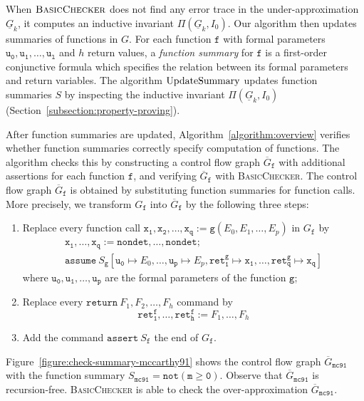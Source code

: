 When $\textsc{BasicChecker}$ does not find any error trace in the
under-approximation $\underline{G}_k$, it computes an inductive
invariant $\Pi (\underline{G}_k, I_0)$. Our algorithm then updates
summaries of functions in $G$. For each function $\mathtt{f}$ with
formal parameters $\mathtt{u_0}, \mathtt{u_1}, \ldots, \mathtt{u_l}$
and $h$ return values, a \emph{function summary} for $\mathtt{f}$ is a
first-order conjunctive formula which specifies the relation between
its formal parameters and return variables. The algorithm
$\textmd{UpdateSummary}$ updates function summaries $S$ by inspecting
the inductive invariant $\Pi (\underline{G}_k, I_0)$
(Section~\ref{subsection:property-proving}). 

After function summaries are updated, Algorithm~\ref{algorithm:overview} 
verifies whether function summaries correctly specify computation of
functions. The algorithm checks this by constructing a control flow
graph $\overline{G}_{\mathtt{f}}$ with additional assertions for each
function $\mathtt{f}$, and verifying $\overline{G}_{\mathtt{f}}$ with
\textsc{BasicChecker}. The control flow graph
$\overline{G}_{\mathtt{f}}$ is obtained by substituting function
summaries for function calls. More precisely, we transform
$G_{\mathtt{f}}$ into $\overline{G}_{\mathtt{f}}$ by the following
three steps:
\begin{enumerate}
\item Replace every function call $\mathtt{x_1}, \mathtt{x_2}, \ldots,
  \mathtt{x_q} := \mathtt{g} (E_0, E_1, \ldots, E_p)$ in $G_{\mathtt{f}}$ by 
  \begin{equation*}
    \begin{array}{l}
      \mathtt{x_1}, \ldots, \mathtt{x_q} :=
      \mathtt{nondet}, \ldots, \mathtt{nondet};\\
      \mathtt{assume}\ 
      S_{\mathtt{g}}[\mathtt{u_0} \mapsto E_0, \ldots, 
      \mathtt{u_p} \mapsto E_p, \mathtt{ret^g_1} \mapsto \mathtt{x_1},
      \ldots, \mathtt{ret^g_q} \mapsto \mathtt{x_q}]
    \end{array}
  \end{equation*}
  where $\mathtt{u_0}, \mathtt{u_1}, \ldots, \mathtt{u_p}$
  are the formal parameters of the function $\mathtt{g}$;
\item Replace every $\mathtt{return\ }F_1, F_2, \ldots, F_h$ command by
  \begin{equation*}
    \mathtt{ret^f_1}, \ldots, \mathtt{ret^f_h} := F_1, \ldots, F_h
  \end{equation*}
\item Add the command $\mathtt{assert\ }S_{\mathtt{f}}$ the end of
  $G_{\mathtt{f}}$. 
\end{enumerate}
Figure~\ref{figure:check-summary-mccarthy91} shows the control flow
graph $\overline{G}_{\mathtt{mc91}}$ with the function summary
$S_{\mathtt{mc91}} = \mathtt{not (m \geq 0)}$. Observe that
$\overline{G}_{\mathtt{mc91}}$ is
recursion-free. \textsc{BasicChecker} is able to check the
over-approximation $\overline{G}_{\mathtt{mc91}}$. 

